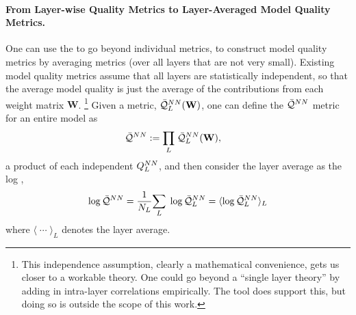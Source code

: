 \paragraph{From Layer-wise Quality Metrics to Layer-Averaged Model Quality Metrics.}
One can use the \HTSR \Phenomenology to go beyond individual \LayerQuality metrics, to construct model quality metrics by averaging \LayerQuality metrics (over all layers that are not very small). 
Existing \HTSR model quality metrics assume that all layers are statistically independent, so that the average model quality is just the average of the contributions from each weight matrix $\mathbf{W}$.%
\footnote{This independence assumption, clearly a mathematical convenience, gets us closer to a workable theory. One could go beyond a ``single layer theory'' by adding in intra-layer correlations empirically. The \WW tool does support this, but doing so is outside the scope of this work.}
%
Given a \LayerQuality metric, $\bar{\mathcal{Q}}^{NN}_{L}(\mathbf{W})$, one can define the \emph{\ModelQuality} $\bar{\mathcal{Q}}^{NN}$ metric for an entire model as 
\begin{align}
\label{eqn:ProductNorm}
\bar{\mathcal{Q}}^{NN}&:=\underset{L}{\prod}\;\bar{\mathcal{Q}}^{NN}_{L}(\mathbf{W}) ,
\end{align}
a product of each independent \LayerQuality $\\Q^{NN}_{L}$, and then consider the layer average as the log \emph{\LayerQuality},
\begin{align}
\label{eqn:LogProductNorm}
\log\bar{\mathcal{Q}}^{NN}=\frac{1}{N_{L}}\underset{L}{\sum}\;\log\bar{\mathcal{Q}}^{NN}_{L}=\langle\log\bar{\mathcal{Q}}^{NN}_{L}\rangle_{L}
\end{align}
where $\langle\;\cdots\;\rangle_{L}$ denotes the layer average.

